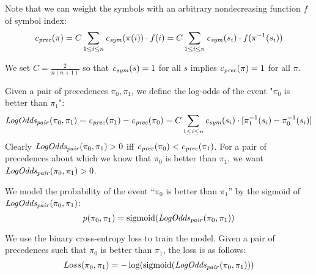 Note that we can weight the symbols with an arbitrary nondecreasing function $f$ of symbol index:
$$
\CostPrec(\pi) =
C \sum_{1 \leq i \leq n} \CostSym(\pi(i)) \cdot f(i) =
C \sum_{1 \leq i \leq n} \CostSym(s_i) \cdot f(\inv{\pi}(s_i))
$$

We set $C = \frac{2}{n(n+1)}$ so that $\CostSym(s) = 1$ for all $s$ implies $\CostPrec(\pi) = 1$ for all $\pi$.

Given a pair of precedences $\pi_0, \pi_1$,
we define the log-odds of the event "$\pi_0$ is better than $\pi_1$":
$$
\CostPrecPair(\pi_0, \pi_1) =
\CostPrec(\pi_1) - \CostPrec(\pi_0) =
C \sum_{1 \leq i \leq n} \CostSym(s_i) \cdot [\inv{\pi_1}(s_i) - \inv{\pi_0}(s_i)]
$$
Clearly $\CostPrecPair(\pi_0, \pi_1) > 0$ iff $\CostPrec(\pi_0) < \CostPrec(\pi_1)$.
For a pair of precedences about which we know that $\pi_0$ is better than $\pi_1$,
we want $\CostPrecPair(\pi_0, \pi_1) > 0$.

We model the probability of the event ``$\pi_0$ is better than $\pi_1$''
by the sigmoid of $\CostPrecPair(\pi_0, \pi_1)$:
$$
p(\pi_0, \pi_1) = \sigmoid(\CostPrecPair(\pi_0, \pi_1))
$$

We use the binary cross-entropy loss to train the model.
Given a pair of precedences such that $\pi_0$ is better than $\pi_1$,
the loss is as follows:
$$
Loss(\pi_0, \pi_1) = -\log(\sigmoid(\CostPrecPair(\pi_0, \pi_1)))
$$

\fi
